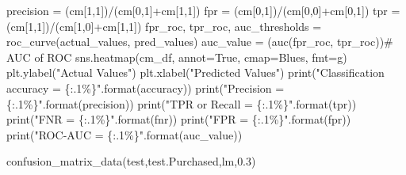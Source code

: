 \documentclass[
  letterpaper,
  DIV=11,
  numbers=noendperiod]{scrreprt}
\newenvironment{Shaded}{\begin{snugshade}}{\end{snugshade}}
\newcommand{\BuiltInTok}[1]{\textcolor[rgb]{0.00,0.23,0.31}{#1}}
\newcommand{\CommentTok}[1]{\textcolor[rgb]{0.37,0.37,0.37}{#1}}
\newcommand{\DecValTok}[1]{\textcolor[rgb]{0.68,0.00,0.00}{#1}}
\newcommand{\FloatTok}[1]{\textcolor[rgb]{0.68,0.00,0.00}{#1}}
\newcommand{\NormalTok}[1]{\textcolor[rgb]{0.00,0.23,0.31}{#1}}
\newcommand{\OperatorTok}[1]{\textcolor[rgb]{0.37,0.37,0.37}{#1}}
\newcommand{\SpecialCharTok}[1]{\textcolor[rgb]{0.37,0.37,0.37}{#1}}
\newcommand{\StringTok}[1]{\textcolor[rgb]{0.13,0.47,0.30}{#1}}
\newcommand{\VariableTok}[1]{\textcolor[rgb]{0.07,0.07,0.07}{#1}}
\begin{document}
\begin{Shaded}
\begin{Highlighting}[]
\NormalTok{    precision }\OperatorTok{=}\NormalTok{ (cm[}\DecValTok{1}\NormalTok{,}\DecValTok{1}\NormalTok{])}\OperatorTok{/}\NormalTok{(cm[}\DecValTok{0}\NormalTok{,}\DecValTok{1}\NormalTok{]}\OperatorTok{+}\NormalTok{cm[}\DecValTok{1}\NormalTok{,}\DecValTok{1}\NormalTok{])}
\NormalTok{    fpr }\OperatorTok{=}\NormalTok{ (cm[}\DecValTok{0}\NormalTok{,}\DecValTok{1}\NormalTok{])}\OperatorTok{/}\NormalTok{(cm[}\DecValTok{0}\NormalTok{,}\DecValTok{0}\NormalTok{]}\OperatorTok{+}\NormalTok{cm[}\DecValTok{0}\NormalTok{,}\DecValTok{1}\NormalTok{])}
\NormalTok{    tpr }\OperatorTok{=}\NormalTok{ (cm[}\DecValTok{1}\NormalTok{,}\DecValTok{1}\NormalTok{])}\OperatorTok{/}\NormalTok{(cm[}\DecValTok{1}\NormalTok{,}\DecValTok{0}\NormalTok{]}\OperatorTok{+}\NormalTok{cm[}\DecValTok{1}\NormalTok{,}\DecValTok{1}\NormalTok{])}
\NormalTok{    fpr\_roc, tpr\_roc, auc\_thresholds }\OperatorTok{=}\NormalTok{ roc\_curve(actual\_values, pred\_values)}
\NormalTok{    auc\_value }\OperatorTok{=}\NormalTok{ (auc(fpr\_roc, tpr\_roc))}\CommentTok{\# AUC of ROC}
\NormalTok{    sns.heatmap(cm\_df, annot}\OperatorTok{=}\VariableTok{True}\NormalTok{, cmap}\OperatorTok{=}\StringTok{\textquotesingle{}Blues\textquotesingle{}}\NormalTok{, fmt}\OperatorTok{=}\StringTok{\textquotesingle{}g\textquotesingle{}}\NormalTok{)}
\NormalTok{    plt.ylabel(}\StringTok{"Actual Values"}\NormalTok{)}
\NormalTok{    plt.xlabel(}\StringTok{"Predicted Values"}\NormalTok{)}
    \BuiltInTok{print}\NormalTok{(}\StringTok{"Classification accuracy = }\SpecialCharTok{\{:.1\%\}}\StringTok{"}\NormalTok{.}\BuiltInTok{format}\NormalTok{(accuracy))}
    \BuiltInTok{print}\NormalTok{(}\StringTok{"Precision = }\SpecialCharTok{\{:.1\%\}}\StringTok{"}\NormalTok{.}\BuiltInTok{format}\NormalTok{(precision))}
    \BuiltInTok{print}\NormalTok{(}\StringTok{"TPR or Recall = }\SpecialCharTok{\{:.1\%\}}\StringTok{"}\NormalTok{.}\BuiltInTok{format}\NormalTok{(tpr))}
    \BuiltInTok{print}\NormalTok{(}\StringTok{"FNR = }\SpecialCharTok{\{:.1\%\}}\StringTok{"}\NormalTok{.}\BuiltInTok{format}\NormalTok{(fnr))}
    \BuiltInTok{print}\NormalTok{(}\StringTok{"FPR = }\SpecialCharTok{\{:.1\%\}}\StringTok{"}\NormalTok{.}\BuiltInTok{format}\NormalTok{(fpr))}
    \BuiltInTok{print}\NormalTok{(}\StringTok{"ROC{-}AUC = }\SpecialCharTok{\{:.1\%\}}\StringTok{"}\NormalTok{.}\BuiltInTok{format}\NormalTok{(auc\_value))}
\end{Highlighting}
\end{Shaded}

\begin{Shaded}
\begin{Highlighting}[]
\NormalTok{confusion\_matrix\_data(test,test.Purchased,lm,}\FloatTok{0.3}\NormalTok{)}
\end{Highlighting}
\end{Shaded}
\end{document}
